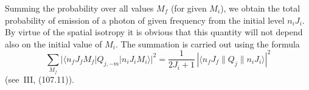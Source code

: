 Summing the probability over all values $M_f$ (for given $M_i$), we obtain the total probability of emission of a photon of given frequency from the initial level $n_i J_i$. By virtue of the spatial isotropy it is obvious that this quantity will not depend also on the initial value of $M_i$. The summation is carried out using the formula
\begin{equation}
\sum_{M_f}|\langle n_f J_f M_f|Q_{j,-m}|n_i J_i M_i\rangle|^2 = \frac{1}{2J_i + 1}\,|\langle n_f J_f\|Q_j\|n_i J_i\rangle|^2
\tag{46.20}
\end{equation}
(see~III, (107.11)).
